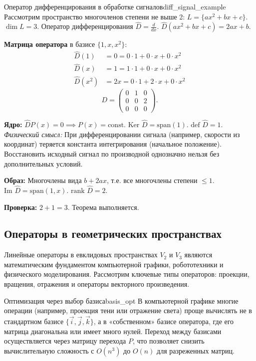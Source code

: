 \documentclass[12pt,a4paper]{article}
\begin{document}
\begin{definition}{Оператор дифференцирования в обработке
  сигналов}{diff_signal_example}
  Рассмотрим пространство многочленов степени не выше 2: $L = \{ ax^2
  + bx + c \}$. $\dim L = 3$.
  Оператор дифференцирования $\hat{D} = \frac{d}{dx}$.
  $\hat{D}(ax^2 + bx + c) = 2ax + b$.

  \textbf{Матрица оператора} в базисе $\{1, x, x^2\}$:
  \begin{align*}
    \hat{D}(1) &= 0 = 0\cdot 1 + 0\cdot x + 0\cdot x^2 \\
    \hat{D}(x) &= 1 = 1\cdot 1 + 0\cdot x + 0\cdot x^2 \\
    \hat{D}(x^2) &= 2x = 0\cdot 1 + 2\cdot x + 0\cdot x^2
  \end{align*}
  \[
    D =
    \begin{pmatrix} 0 & 1 & 0 \\ 0 & 0 & 2 \\ 0 & 0 & 0
    \end{pmatrix}.
  \]

  \textbf{Ядро:} $\hat{D}P(x) = 0 \implies P(x) = \text{const}$.
  $\text{Ker } \hat{D} = \text{span}(1)$. $\text{def } \hat{D} = 1$.
  \textit{Физический смысл:} При дифференцировании сигнала (например,
  скорости из координат) теряется константа интегрирования (начальное
  положение). Восстановить исходный сигнал по производной однозначно
  нельзя без дополнительных условий.

  \textbf{Образ:} Многочлены вида $b + 2ax$, т.е. все многочлены
  степени $\le 1$.
  $\text{Im } \hat{D} = \text{span}(1, x)$. $\text{rank } \hat{D} = 2$.

  \textbf{Проверка:} $2 + 1 = 3$. Теорема выполняется.
\end{definition}

\subsection{Операторы в геометрических пространствах}

Линейные операторы в евклидовых пространствах $V_2$ и $V_3$ являются
математическим фундаментом компьютерной графики, робототехники и
физического моделирования. Рассмотрим ключевые типы операторов:
проекции, вращения, отражения и операторы векторного произведения.

\begin{remarkIT}{Оптимизация через выбор базиса}{basis_opt}
  В компьютерной графике многие операции (например, проекция тени или
  отражение света) проще вычислять не в стандартном базисе
  $\{\vec{i}, \vec{j}, \vec{k}\}$, а в «собственном» базисе
  оператора, где его матрица диагональна или имеет много нулей.
  Переход между базисами осуществляется через матрицу перехода $P$,
  что позволяет снизить вычислительную сложность с $O(n^3)$ до $O(n)$
  для разреженных матриц.
\end{remarkIT}
\end{document}
